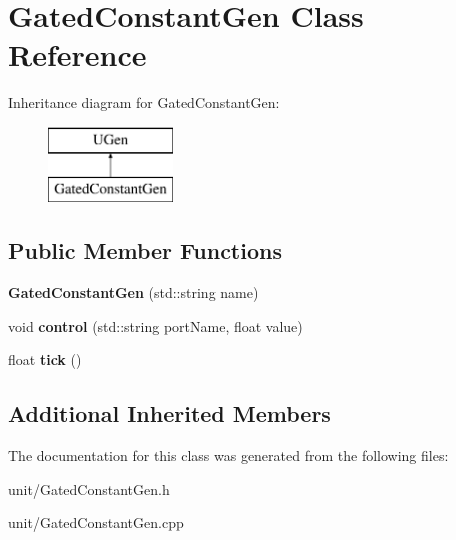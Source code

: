\hypertarget{classGatedConstantGen}{}\section{Gated\+Constant\+Gen Class Reference}
\label{classGatedConstantGen}
Inheritance diagram for Gated\+Constant\+Gen\+:\begin{figure}[H]
\begin{center}
\leavevmode
\includegraphics[height=2.000000cm]{classGatedConstantGen}
\end{center}
\end{figure}
\subsection*{Public Member Functions}
\begin{DoxyCompactItemize}
\item 
{\bfseries Gated\+Constant\+Gen} (std\+::string name)\hypertarget{classGatedConstantGen_ad30ad26411f421228c8f7075b4d27f9a}{}\label{classGatedConstantGen_ad30ad26411f421228c8f7075b4d27f9a}

\item 
void {\bfseries control} (std\+::string port\+Name, float value)\hypertarget{classGatedConstantGen_a8365ddc2a6ddebc86e196fa381a5648d}{}\label{classGatedConstantGen_a8365ddc2a6ddebc86e196fa381a5648d}

\item 
float {\bfseries tick} ()\hypertarget{classGatedConstantGen_aafff659359fed9f28c703acd0076c081}{}\label{classGatedConstantGen_aafff659359fed9f28c703acd0076c081}

\end{DoxyCompactItemize}
\subsection*{Additional Inherited Members}


The documentation for this class was generated from the following files\+:\begin{DoxyCompactItemize}
\item 
unit/Gated\+Constant\+Gen.\+h\item 
unit/Gated\+Constant\+Gen.\+cpp\end{DoxyCompactItemize}
